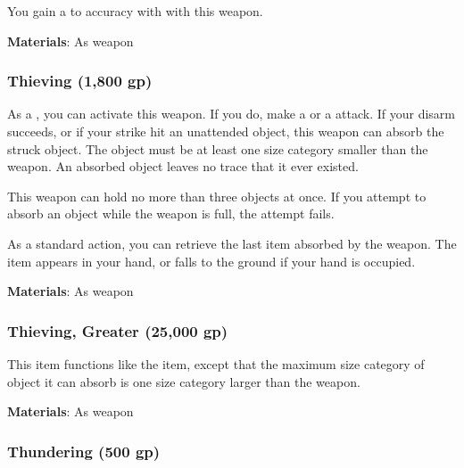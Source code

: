 You gain a   to accuracy with  with this weapon.



\vspace{0.25em}
\textbf{Materials}: As weapon


\lowercase{\hypertarget{item:Thieving}{}}\label{item:Thieving}
\hypertarget{item:Thieving}{\subsubsection{Thieving\hfill{} (1,800 gp)}}

As a , you can activate this weapon.
If you do, make a  or a  attack.
If your disarm succeeds, or if your strike hit an unattended object, this weapon can absorb the struck object.
The object must be at least one size category smaller than the weapon.
An absorbed object leaves no trace that it ever existed.

This weapon can hold no more than three objects at once.
If you attempt to absorb an object while the weapon is full, the attempt fails.

As a standard action, you can retrieve the last item absorbed by the weapon.
The item appears in your hand, or falls to the ground if your hand is occupied.



\vspace{0.25em}
\textbf{Materials}: As weapon


\lowercase{\hypertarget{item:Thieving, Greater}{}}\label{item:Thieving, Greater}
\hypertarget{item:Thieving, Greater}{\subsubsection{Thieving, Greater\hfill{} (25,000 gp)}}

This item functions like the  item, except that the maximum size category of object it can absorb is one size category larger than the weapon.



\vspace{0.25em}
\textbf{Materials}: As weapon


\lowercase{\hypertarget{item:Thundering}{}}\label{item:Thundering}
\hypertarget{item:Thundering}{\subsubsection{Thundering\hfill{} (500 gp)}}

